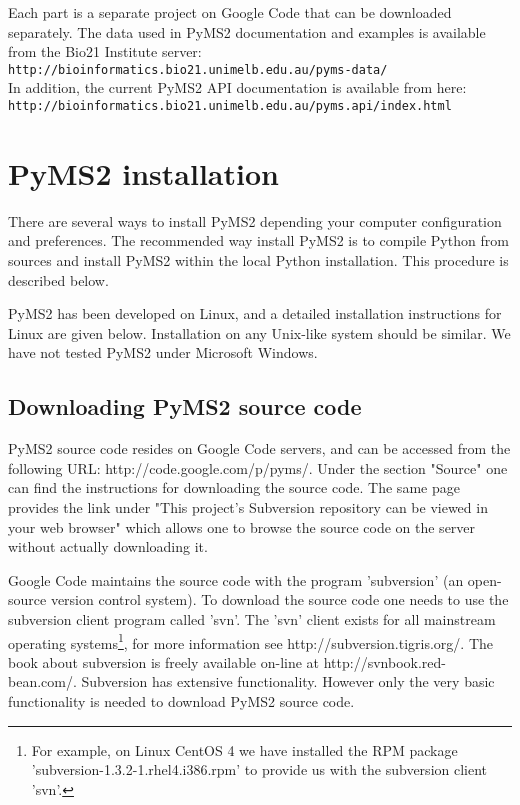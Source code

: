 Each part is a separate project on Google Code that can be downloaded
separately. The data used in PyMS2 documentation and examples is available
from the Bio21 Institute server:\\
{\tt http://bioinformatics.bio21.unimelb.edu.au/pyms-data/}\\
In addition, the current PyMS2 API documentation is available from here:\\
{\tt http://bioinformatics.bio21.unimelb.edu.au/pyms.api/index.html}

\section{PyMS2 installation}

There are several ways to install PyMS2 depending your computer configuration
and preferences. The recommended way install PyMS2 is to compile Python
from sources and install PyMS2 within the local Python installation. This
procedure is described below.

PyMS2 has been developed on Linux, and a detailed installation instructions
for Linux are given below. Installation on any Unix-like system should be
similar. We have not tested PyMS2 under Microsoft Windows.

\subsection{Downloading PyMS2 source code}

PyMS2 source code resides on Google Code servers, and can be accessed
from the following URL: http://code.google.com/p/pyms/. Under the
section "Source" one can find the instructions for downloading the
source code. The same page provides the link under "This project's
Subversion repository can be viewed in your web browser" which allows
one to browse the source code on the server without actually downloading
it.

Google Code maintains the source code with the program 'subversion'
(an open-source version control system). To download the source code
one needs to use the subversion client program called 'svn'. The 'svn'
client exists for all mainstream operating systems\footnote{For example,
on Linux CentOS 4 we have installed the RPM package
'subversion-1.3.2-1.rhel4.i386.rpm' to provide us with the subversion
client 'svn'.}, for more information see http://subversion.tigris.org/.
The book about subversion is freely available on-line at
http://svnbook.red-bean.com/. Subversion has extensive functionality.
However only the very basic functionality is needed to download PyMS2
source code.

